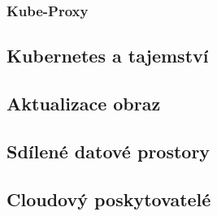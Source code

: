 \subsubsection{Kube-Proxy}



\subsection{Kubernetes a tajemství}



\subsection{Aktualizace obraz}



\subsection{Sdílené datové prostory}



\subsection{Cloudový poskytovatelé}



